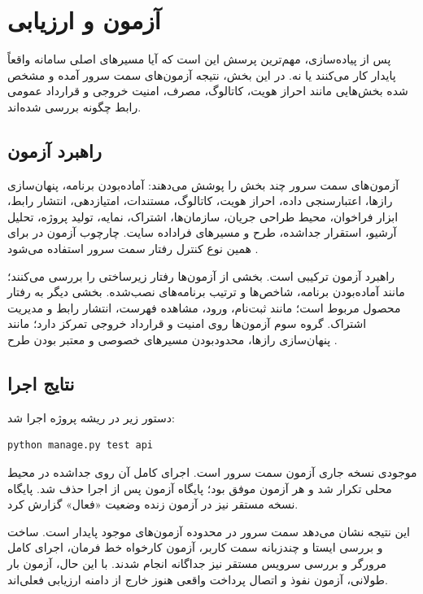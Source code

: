 \chapter{آزمون و ارزیابی}

پس از پیاده‌سازی، مهم‌ترین پرسش این است که آیا مسیرهای اصلی سامانه واقعاً پایدار کار می‌کنند یا نه. در این بخش، نتیجه آزمون‌های سمت سرور آمده و مشخص شده بخش‌هایی مانند احراز هویت، کاتالوگ، مصرف، امنیت خروجی و قرارداد عمومی رابط چگونه بررسی شده‌اند.

\section{راهبرد آزمون}
آزمون‌های سمت سرور چند بخش را پوشش می‌دهند: آماده‌بودن برنامه، پنهان‌سازی رازها، اعتبارسنجی داده، احراز هویت، کاتالوگ، مستندات، امتیازدهی، انتشار رابط، ابزار فراخوان، محیط طراحی جریان، سازمان‌ها، اشتراک، نمایه، تولید پروژه، تحلیل آرشیو، استقرار جداشده، طرح  و مسیرهای فراداده سایت. چارچوب آزمون در  برای همین نوع کنترل رفتار سمت سرور استفاده می‌شود \cite{django}.

راهبرد آزمون ترکیبی است. بخشی از آزمون‌ها رفتار زیرساختی را بررسی می‌کنند؛ مانند آماده‌بودن برنامه، شاخص‌ها و ترتیب برنامه‌های نصب‌شده. بخشی دیگر به رفتار محصول مربوط است؛ مانند ثبت‌نام، ورود، مشاهده فهرست، انتشار رابط و مدیریت اشتراک. گروه سوم آزمون‌ها روی امنیت و قرارداد خروجی تمرکز دارد؛ مانند پنهان‌سازی رازها، محدودبودن مسیرهای خصوصی و معتبر بودن طرح .

\section{نتایج اجرا}
دستور زیر در ریشه پروژه اجرا شد:
\begin{latin}
\begin{lstlisting}
python manage.py test api
\end{lstlisting}
\end{latin}

موجودی نسخه جاری  آزمون سمت سرور است. اجرای کامل آن روی  جداشده در محیط محلی تکرار شد و هر  آزمون موفق بود؛ پایگاه آزمون پس از اجرا حذف شد. پایگاه نسخه مستقر نیز در آزمون زنده وضعیت «فعال» گزارش کرد.

این نتیجه نشان می‌دهد سمت سرور در محدوده آزمون‌های موجود پایدار است. ساخت و بررسی ایستا و چندزبانه سمت کاربر، آزمون کارخواه خط فرمان، اجرای کامل مرورگر و بررسی سرویس مستقر نیز جداگانه انجام شدند. با این حال، آزمون بار طولانی، آزمون نفوذ و اتصال پرداخت واقعی هنوز خارج از دامنه ارزیابی فعلی‌اند.

